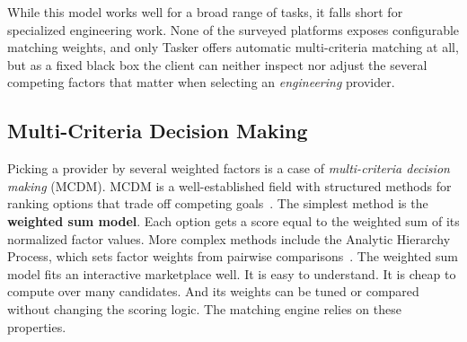 \begin{table}[ht]
	\centering
	\caption{How existing platforms match supply with demand.}
	\label{tab:platforms}
\end{table}

While this model works well for a broad range of tasks, it falls short for
specialized engineering work. None of the surveyed platforms exposes
configurable matching weights, and only Tasker offers automatic multi-criteria
matching at all, but as a fixed black box the client can neither inspect nor
adjust the several competing factors that matter when selecting an
\textit{engineering} provider.

\subsection{Multi-Criteria Decision Making}
Picking a provider by several weighted factors is a case of
\textit{multi-criteria decision making} (MCDM). MCDM is a well-established field
with structured methods for ranking options that trade off competing
goals~\cite{triantaphyllou2000multi}. The simplest method is the
\textbf{weighted sum model}. Each option gets a score equal to the weighted sum
of its normalized factor values. More complex methods include the Analytic
Hierarchy Process, which sets factor weights from pairwise
comparisons~\cite{saaty1980analytic}. The weighted sum model fits an interactive
marketplace well. It is easy to understand. It is cheap to compute over many
candidates. And its weights can be tuned or compared without changing the
scoring logic. The matching engine relies on these properties.

